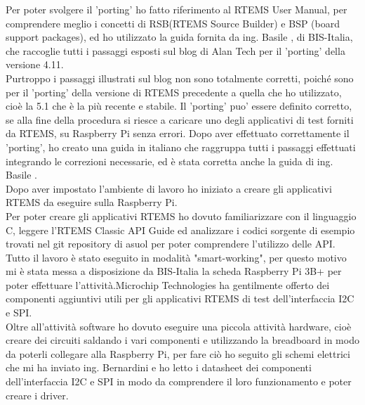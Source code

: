 \documentclass[12pt, a4paper, titlepage, oneside]{book}
\begin{document}
\begin{flushleft}
Per poter svolgere il 'porting' ho fatto riferimento al RTEMS User Manual\cite{rtemsUM}, per comprendere meglio i concetti di RSB(RTEMS Source Builder) e BSP (board support packages), 
ed ho utilizzato la guida fornita da ing. Basile \cite{giorgio}, di BIS-Italia, che raccoglie tutti i passaggi esposti sul blog di Alan Tech per il 'porting' della versione 4.11.\\
Purtroppo i passaggi illustrati sul blog non sono totalmente corretti, poiché sono per il 'porting' della versione di RTEMS precedente a quella che ho utilizzato, cioè la 5.1 che è la più recente e stabile.
Il 'porting' puo' essere definito corretto, se alla fine della procedura si riesce a caricare uno degli applicativi di test forniti da RTEMS, su Raspberry Pi senza errori.
Dopo aver effettuato correttamente il 'porting', ho creato una guida in italiano  che raggruppa tutti i passaggi effettuati integrando le correzioni necessarie, ed è stata corretta anche la guida di ing. Basile \cite{giorgio5}.\\
Dopo aver impostato l'ambiente di lavoro ho iniziato a creare gli applicativi RTEMS da eseguire sulla Raspberry Pi.\\
Per poter creare gli applicativi RTEMS ho dovuto  familiarizzare con il linguaggio C, leggere l'RTEMS Classic API Guide \cite{rtemsCAG} ed analizzare i codici sorgente di esempio trovati nel git repository di asuol\cite{asuol} per poter comprendere l'utilizzo delle API. \\
Tutto il lavoro è stato eseguito in modalità "smart-working", per questo motivo mi è stata messa a disposizione da BIS-Italia la scheda Raspberry Pi 3B+ per poter effettuare l'attività.Microchip Technologies ha gentilmente offerto dei componenti aggiuntivi utili per gli applicativi RTEMS di test dell'interfaccia I2C e SPI.\\
Oltre all'attività software ho dovuto eseguire una piccola attività hardware, cioè creare dei circuiti saldando i vari componenti e utilizzando la breadboard in modo da poterli collegare alla Raspberry Pi, per fare ciò ho seguito gli schemi elettrici che mi ha inviato ing. Bernardini e ho letto i datasheet dei componenti dell'interfaccia I2C \cite{microchipMCP3425} \cite{microchipADC} e  SPI \cite{microchipMCP4822} \cite{microchipMSOP10-8} in modo da comprendere il loro funzionamento e poter creare i driver.\\


\end{flushleft}
\end{document}
